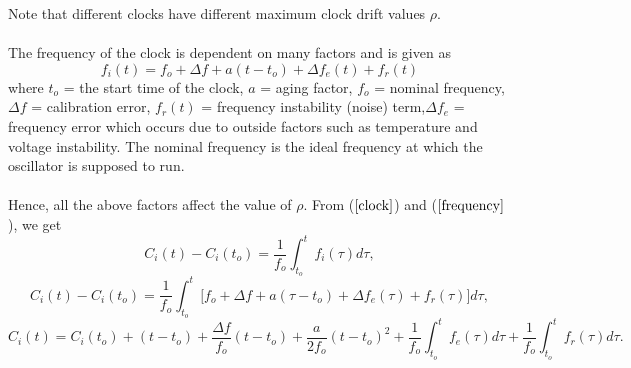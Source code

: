 \documentclass[a4paper,10pt]{report}
\begin{document}
Note that different clocks have different maximum clock drift values
$\rho$.\paragraph*{} The frequency of the clock is dependent on many factors and is given as
\begin{equation}
f_i(t) = f_o + \Delta f + a(t-t_o) + \Delta f_e(t) + f_r(t)
\label{frequency}
\end{equation}
where \newline $t_o$ = the start time of the clock, \newline $a$ = aging factor, \newline $f_o$ = nominal frequency, \newline $\Delta
f$ = calibration error, \newline $f_r(t)$ = frequency instability (noise) term,\newline $\Delta f_e$ = frequency error which occurs
due to outside factors such as temperature and voltage instability.\newline
The nominal frequency is the ideal frequency at which the oscillator is supposed to run. \paragraph*{} Hence, all the above factors affect the value of $\rho$. From ($\ref{clock}$) and ($\ref{frequency}$), we get
\begin{equation}
C_i(t) - C_i(t_o) = \frac{1}{f_o} \int^{t}_{t_o}f_i(\tau)d\tau ,
\end{equation}
\begin{equation}
C_i(t) - C_i(t_o) = \frac{1}{f_o} \int^{t}_{t_o}{[f_o + \Delta f + a(\tau-t_o)  } + \Delta f_e(\tau) + f_r(\tau)]d\tau ,
\label{fasika}
\end{equation}
\begin{equation}
C_i(t) =  C_i(t_o) + (t-t_o) +\frac{\Delta f}{f_o}(t-t_o) + \frac{a}{2f_o}(t-t_o)^2 + \frac{1}{f_o}\int^{t}_{t_o}{f_e(\tau)d\tau} +
\frac{1}{f_o}\int^{t}_{t_o}{f_r(\tau)d\tau} .
\label{freqmodel}
\end{equation}
\end{document}

